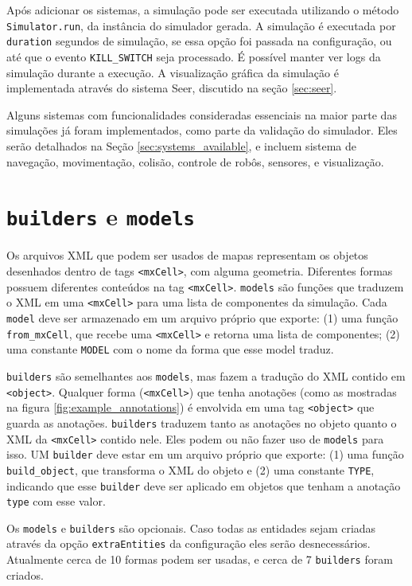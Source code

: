 Após adicionar os sistemas, a simulação pode ser executada utilizando o método \texttt{Simulator.run}, da instância do simulador gerada. A simulação é executada por \texttt{duration} segundos de simulação, se essa opção foi passada na configuração, ou até que o evento \texttt{KILL\_SWITCH} seja processado. É possível manter ver logs da simulação durante a execução. A visualização gráfica da simulação é implementada através do sistema Seer, discutido na seção \ref{sec:seer}.

Alguns sistemas com funcionalidades consideradas essenciais na maior parte das simulações já foram implementados, como parte da validação do simulador. Eles serão detalhados na Seção \ref{sec:systems_available}, e incluem sistema de navegação, movimentação, colisão, controle de robôs, sensores, e visualização.

\section{\texttt{builders} e \texttt{models}}
\label{sec:builders_and_models}

Os arquivos XML que podem ser usados de mapas representam os objetos desenhados dentro de tags \texttt{<mxCell>}, com alguma geometria. Diferentes formas possuem diferentes conteúdos na tag \texttt{<mxCell>}. \texttt{models} são funções que traduzem o XML em uma \texttt{<mxCell>} para uma lista de componentes da simulação. Cada \texttt{model} deve ser armazenado em um arquivo próprio que exporte: (1) uma função \texttt{from\_mxCell}, que recebe uma \texttt{<mxCell>} e retorna uma lista de componentes; (2) uma constante \texttt{MODEL} com o nome da forma que esse model traduz.

\texttt{builders} são semelhantes aos \texttt{models}, mas fazem a tradução do XML contido em \texttt{<object>}. Qualquer forma (\texttt{<mxCell>}) que tenha anotações (como as mostradas na figura \ref{fig:example_annotations}) é envolvida em uma tag \texttt{<object>} que guarda as anotações. \texttt{builders} traduzem tanto as anotações no objeto quanto o XML da \texttt{<mxCell>} contido nele. Eles podem ou não fazer uso de \texttt{models} para isso. UM \texttt{builder} deve estar em um arquivo próprio que exporte: (1) uma função \texttt{build\_object}, que transforma o XML do objeto e (2) uma constante \texttt{TYPE}, indicando que esse \texttt{builder} deve ser aplicado em objetos que tenham a anotação \texttt{type} com esse valor.

Os \texttt{models} e \texttt{builders} são opcionais. Caso todas as entidades sejam criadas através da opção \texttt{extraEntities} da configuração eles serão desnecessários. Atualmente cerca de 10 formas podem ser usadas, e cerca de 7 \texttt{builders} foram criados.

